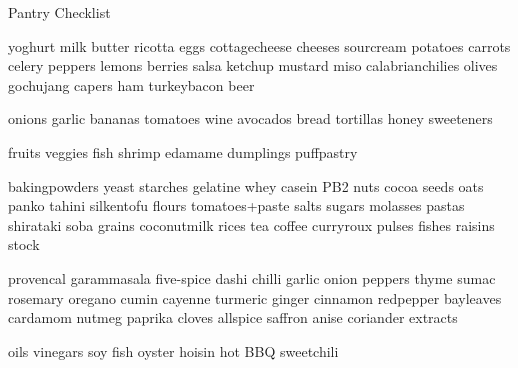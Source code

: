 
\begin{densecard}{Pantry Checklist}{}
\begin{paracol}{3}
{}
yoghurt
milk
butter
ricotta
eggs
cottage\ijoin{}cheese
cheeses
sour\ijoin{}cream
potatoes
carrots
celery
peppers
lemons
berries
salsa
ketchup
mustard
miso
calabrian\ijoin{}chilies
olives
gochujang
capers
ham
turkey\ijoin{}bacon
beer

onions
garlic
bananas
tomatoes
wine
avocados
bread
tortillas
honey
sweeteners

\nextcolumn

fruits
veggies
fish
shrimp
edamame
dumplings
puff\ijoin{}pastry

baking\ijoin{}powders
yeast
starches
\mbox{gelatine}
whey casein
PB2
nuts
cocoa
seeds
oats
panko
tahini
silken\ijoin{}tofu
flours
tomatoes+paste
salts
sugars
molasses
pastas
shirataki
soba
grains
coconut\ijoin{}milk
rices
tea
coffee
curry\ijoin{}roux
pulses
fishes
raisins
stock

\nextcolumn

provencal
garam\ijoin{}masala
\mbox{five-spice}
dashi
chilli
garlic
onion
peppers
thyme
sumac
rosemary
oregano
cumin
cayenne
turmeric
ginger
cinnamon
red\ijoin{}pepper
bay\ijoin{}leaves
cardamom
nutmeg
paprika
cloves
allspice
saffron
anise
coriander
extracts

oils
\mbox{vinegars}
soy
fish
oyster
hoisin
hot
BBQ
sweet\ijoin{}chili

\end{paracol}
\end{densecard}

